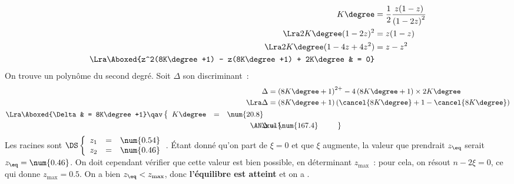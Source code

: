 \documentclass[../../main/main.tex]{subfiles}
\begin{document}
{\begin{align*}
		K\degree                                                & = \frac{1}{2} \frac{z(1-z)}{\left( 1 - 2z \right)^2}
		\\\Lra
		2K\degree(1-2z)^2                                       & = z(1-z)
		\\\Lra
		2K\degree(1-4z + 4z^2)                                  & = z - z^2
		\\\Lra
		\Aboxed{z^2(8K\degree +1) - z(8K\degree +1) + 2K\degree & = 0}
	\end{align*}
	On trouve un polynôme du second degré. Soit $\Delta$ son discriminant~:
	\begin{align*}
		\Delta         & = \left( 8K\degree+1 \right)^{2+} -
		4\left(8K\degree+1\right)\times 2K\degree
		\\\Lra
		\Delta         & = \left( 8K\degree+1 \right)\left(
		\cancel{8K\degree}+1-\cancel{8K\degree} \right)
		\\\Lra
		\Aboxed{\Delta & = 8K\degree+1}
		\qav
		\left\{
		\begin{array}{rcl}
			K\degree & = & \num{20.8}
		\end{array}
		\right.                                             \\
		\makebox[0pt][l]{$\phantom{\AN}\xul{\phantom{\Delta = \num{167.4}}}$}
		\AN
		\Delta         & = \num{167.4}
	\end{align*}
	Les racines sont
	$\DS\left\{
		\begin{array}{rcl}
			z_1 & = & \num{0.54} \\
			z_2 & = & \num{0.46}
		\end{array}
		\right.$.
	\bigbreak
	Étant donné qu'on part de $\xi = 0$ et que $\xi$ augmente, la valeur que
	prendrait $z_{\eq}$ serait $z_{\eq} = \num{0.46}$. On doit cependant
	vérifier que cette valeur est bien possible, en déterminant $z_{\max}$~:
	pour cela, on résout $n-2\xi = 0$, ce qui donne $z_{\max} = \num{0.5}$.
	On a bien $z_{\eq} < z_{\max}$, donc \textbf{l'équilibre est atteint} et
	on a .
}
\end{document}
